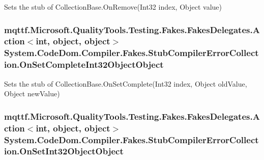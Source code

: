 Sets the stub of Collection\-Base.\-On\-Remove(\-Int32 index, Object value)

\hypertarget{class_system_1_1_code_dom_1_1_compiler_1_1_fakes_1_1_stub_compiler_error_collection_a1f24dc8dc6b5fbce9ff5c04ade2fb4c1}{
\subsubsection[{On\-Set\-Complete\-Int32\-Object\-Object}]{\setlength{\rightskip}{0pt plus 5cm}mqttf.\-Microsoft.\-Quality\-Tools.\-Testing.\-Fakes.\-Fakes\-Delegates.\-Action$<$int, object, object$>$ System.\-Code\-Dom.\-Compiler.\-Fakes.\-Stub\-Compiler\-Error\-Collection.\-On\-Set\-Complete\-Int32\-Object\-Object}}\label{class_system_1_1_code_dom_1_1_compiler_1_1_fakes_1_1_stub_compiler_error_collection_a1f24dc8dc6b5fbce9ff5c04ade2fb4c1}


Sets the stub of Collection\-Base.\-On\-Set\-Complete(\-Int32 index, Object old\-Value, Object new\-Value)

\hypertarget{class_system_1_1_code_dom_1_1_compiler_1_1_fakes_1_1_stub_compiler_error_collection_ac73f8e3379a54b7ad693f5188167dd4b}{
\subsubsection[{On\-Set\-Int32\-Object\-Object}]{\setlength{\rightskip}{0pt plus 5cm}mqttf.\-Microsoft.\-Quality\-Tools.\-Testing.\-Fakes.\-Fakes\-Delegates.\-Action$<$int, object, object$>$ System.\-Code\-Dom.\-Compiler.\-Fakes.\-Stub\-Compiler\-Error\-Collection.\-On\-Set\-Int32\-Object\-Object}}\label{class_system_1_1_code_dom_1_1_compiler_1_1_fakes_1_1_stub_compiler_error_collection_ac73f8e3379a54b7ad693f5188167dd4b}



